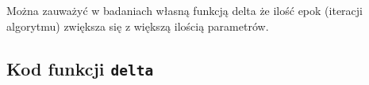 \documentclass[pointlessnumbers, abstracton, headsepline, a4paper]{scrartcl}
\begin{document}
Można zauważyć w badaniach własną funkcją delta że ilość epok (iteracji algorytmu) zwiększa się z większą ilością parametrów.

\clearpage
\subsection{Kod funkcji \texttt{delta}}

\begin{center}

\end{center}
\end{document}
